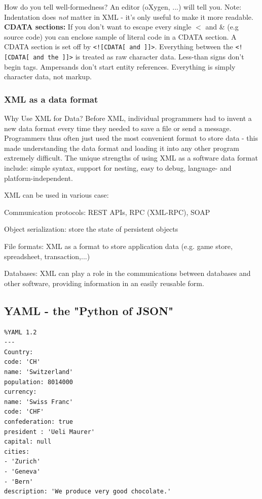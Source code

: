 \documentclass[11pt,oneside,a4paper]{article}
\begin{document}
How do you tell well-formedness? An editor (oXygen, ...) will tell you. Note: Indentation does \textit{not} matter in XML - it's only useful to make it more readable.\\

\textbf{CDATA sections:} If you don't want to escape every single $<$ and \& (e.g source code) you can enclose sample of literal code in a CDATA section. A CDATA section is set off by \verb|<![CDATA[ and ]]>|. Everything between the \verb|<![CDATA[ and the ]]>| is treated as raw character data. Less-than signs don’t begin tags. Ampersands don’t start entity references. Everything is simply character data, not markup.

\subsubsection{XML as a data format}

Why Use XML for Data? Before XML, individual programmers had to invent a new data format every time they needed to save a file or send a message. Programmers thus often just used the most convenient format to store data - this made understanding the data format and loading it into any other program extremely difficult. The unique strengths of using XML as a software data format include: simple syntax, support for nesting, easy to debug, language- and platform-independent.

XML can be used in various case:

\begin{compactitem}
	\item Communication protocols: REST APIs, RPC (XML-RPC), SOAP
	\item Object serialization: store the state of persistent objects
	\item File formats: XML as a format to store application data (e.g. game store, spreadsheet, transaction,...)
	\item Databases: XML can play a role in the communications between databases and other software, providing information in an easily reusable form. 
\end{compactitem}

\subsection{YAML - the "Python of JSON"}

\begin{verbatim}
%YAML 1.2
---
Country:
code: 'CH'
name: 'Switzerland'
population: 8014000
currency:
name: 'Swiss Franc'
code: 'CHF'
confederation: true
president : 'Ueli Maurer'
capital: null
cities:
- 'Zurich'
- 'Geneva'
- 'Bern'
description: 'We produce very good chocolate.'
\end{verbatim}
\end{document}
